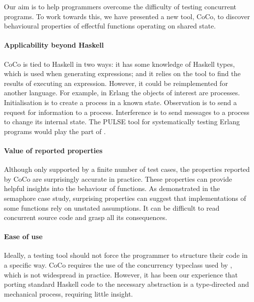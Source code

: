Our aim is to help programmers overcome the difficulty of testing
concurrent programs.  To work towards this, we have presented a new
tool, CoCo, to discover behavioural properties of effectful functions
operating on shared state.

\paragraph{Applicability beyond Haskell}
CoCo is tied to Haskell in two ways: it has some knowledge of Haskell
types, which is used when generating expressions; and it relies on the
\dejafu{} tool to find the results of executing an expression.
However, it could be reimplemented for another language.  For example,
in Erlang the objects of interest are processes.  Initialisation is to
create a process in a known state.  Observation is to send a request
for information to a process.  Interference is to send messages to a
process to change its internal state.  The PULSE tool for
systematically testing Erlang programs\cite{claessen2009} would play
the part of \dejafu{}.

\paragraph{Value of reported properties}
Although only supported by a finite number of test cases, the
properties reported by CoCo are surprisingly accurate in practice.
These properties can provide helpful insights into the behaviour of
functions.  As demonstrated in the semaphore case study, surprising
properties can suggest that implementations of some functions rely on
unstated assumptions.  It can be difficult to read concurrent source
code and grasp all its consequences.

\paragraph{Ease of use}
Ideally, a testing tool should not force the programmer to structure
their code in a specific way.  CoCo requires the use of the
concurrency typeclass used by \dejafu{}, which is not widespread in
practice.  However, it has been our experience that porting standard
Haskell code to the necessary abstraction is a type-directed and
mechanical process, requiring little insight.

